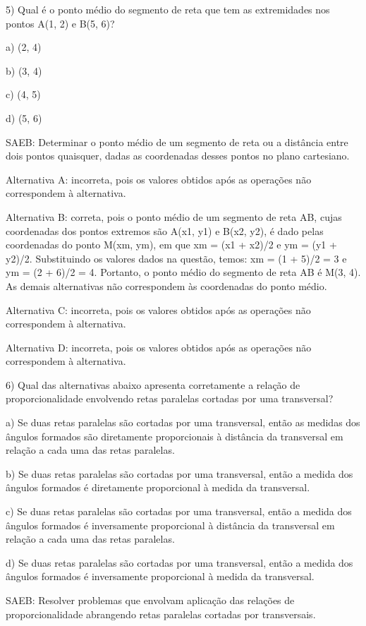 5) Qual é o ponto médio do segmento de reta que tem as extremidades nos
pontos A(1, 2) e B(5, 6)?

a) (2, 4)

b) (3, 4)

c) (4, 5)

d) (5, 6)

SAEB: Determinar o ponto médio de um segmento de reta ou a distância
entre dois pontos quaisquer, dadas as coordenadas desses pontos no plano
cartesiano.

Alternativa A: incorreta, pois os valores obtidos após as operações não
correspondem à alternativa.

Alternativa B: correta, pois o ponto médio de um segmento de reta AB,
cujas coordenadas dos pontos extremos são A(x1, y1) e B(x2, y2), é dado
pelas coordenadas do ponto M(xm, ym), em que xm = (x1 + x2)/2 e ym = (y1
+ y2)/2. Substituindo os valores dados na questão, temos: xm = (1 + 5)/2
= 3 e ym = (2 + 6)/2 = 4. Portanto, o ponto médio do segmento de reta AB
é M(3, 4). As demais alternativas não correspondem às coordenadas do
ponto médio.

Alternativa C: incorreta, pois os valores obtidos após as operações não
correspondem à alternativa.

Alternativa D: incorreta, pois os valores obtidos após as operações não
correspondem à alternativa.

6) Qual das alternativas abaixo apresenta corretamente a relação de
proporcionalidade envolvendo retas paralelas cortadas por uma
transversal?

a) Se duas retas paralelas são cortadas por uma transversal, então as
medidas dos ângulos formados são diretamente proporcionais à distância
da transversal em relação a cada uma das retas paralelas.

b) Se duas retas paralelas são cortadas por uma transversal, então a
medida dos ângulos formados é diretamente proporcional à medida da
transversal.

c) Se duas retas paralelas são cortadas por uma transversal, então a
medida dos ângulos formados é inversamente proporcional à distância da
transversal em relação a cada uma das retas paralelas.

d) Se duas retas paralelas são cortadas por uma transversal, então a
medida dos ângulos formados é inversamente proporcional à medida da
transversal.

SAEB: Resolver problemas que envolvam aplicação das relações de
proporcionalidade abrangendo retas paralelas cortadas por transversais.

